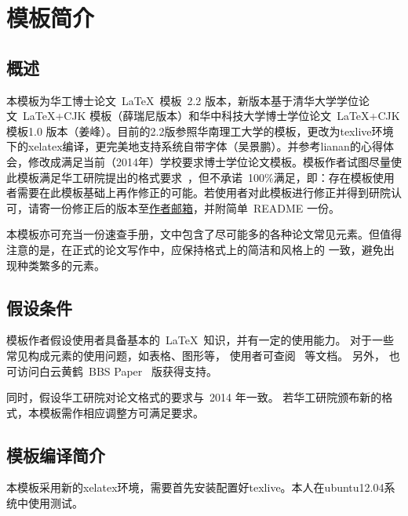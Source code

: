 \renewcommand{\thefootnote}{\arabic{footnote}}

\chapter{模板简介}
\label{cha:intro}

\section{概述}
\label{sec:general intro}

本模板为华工博士论文~\LaTeX~模板~2.2
版本，新版本基于清华大学学位论文~\LaTeX+CJK
模板（薛瑞尼版本）和华中科技大学博士学位论文~\LaTeX+CJK 模板1.0
版本（姜峰）。目前的2.2版参照华南理工大学的模板，更改为texlive环境下的xelatex编译，更完美地支持系统自带字体（吴景鹏）。并参考lianan的心得体会，修改成满足当前（2014年）学校要求博士学位论文模板。模板作者试图尽量使此模板满足华工研院提出的格式要求~\cite{meng}，但不承诺~100\%满足，即：存在模板使用者需要在此模板基础上再作修正的可能。若使用者对此模板进行修正并得到研院认可，请寄一份修正后的版本至\href{hust_liuhuikan@yeah.net}{作者邮箱}，并附简单~README 一份。

本模板亦可充当一份速查手册，文中包含了尽可能多的各种论文常见元素。但值得注意的是，在正式的论文写作中，应保持格式上的简洁和风格上的
一致，避免出现种类繁多的元素。

\section{假设条件}
\label{sec:assumption}

模板作者假设使用者具备基本的~\LaTeX~知识，并有一定的使用能力。
对于一些常见构成元素的使用问题，如表格、图形等，
使用者可查阅~ 等文档。 另外，
也可访问白云黄鹤~BBS Paper~ 版获得支持。

同时，假设华工研院对论文格式的要求与~2014 年一致。
若华工研院颁布新的格式，本模板需作相应调整方可满足要求。

\section{模板编译简介}
\label{sec:compile}
本模板采用新的xelatex环境，需要首先安装配置好texlive。本人在ubuntu12.04系统中使用测试。

